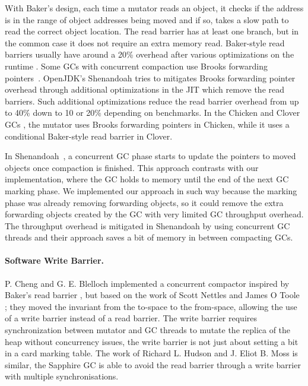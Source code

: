 \documentclass[sigplan,10pt,review,anonymous]{acmart}\settopmatter{printfolios=true,printccs=false,printacmref=false}
\newcommand{\todo}[1]{\color{orange}\fbox{\bfseries\sffamily\scriptsize TODO:}{\sf\small$\blacktriangleright$\textit{#1}$\blacktriangleleft$}\color{black}}
\begin{document}
With Baker's design, each time a mutator reads an object, it checks if the address is in the range of object addresses being moved and if so, takes a slow path to read the correct object location. The read barrier has at least one branch, but in the common case it does not require an extra memory read. Baker-style read barriers usually have around a 20\% overhead after various optimizations on the runtime \cite{BarrierMethods}.
Some GCs with concurrent compaction use Brooks forwarding pointers~\cite{MetronomeIBMGC,RTGCBrooksReadBarrier,Shenandoah}.
OpenJDK's Shenandoah \cite{Shenandoah} tries to mitigates Brooks forwarding pointer overhead through additional optimizations in the JIT which remove the read barriers. Such additional optimizations reduce the read barrier overhead from up to 40\% down to 10 or 20\% depending on benchmarks. In the Chicken and Clover GCs \cite{RTConcCompactGC}, the mutator uses Brooks forwarding pointers in Chicken, while it uses a conditional Baker-style read barrier in Clover.

In Shenandoah~\cite{Shenandoah}, a concurrent GC phase starts to update the pointers to moved objects once compaction is finished. This approach contrasts with our implementation, where the GC holds to memory until the end of the next GC marking phase. We implemented our approach in such way because the marking phase was already removing forwarding objects, so it could remove the extra forwarding objects created by the GC with very limited GC throughput overhead. The throughput overhead is mitigated in Shenandoah by using concurrent GC threads and their approach saves a bit of memory in between compacting GCs.

\paragraph{Software Write Barrier.}
P. Cheng and G. E. Blelloch \cite{WBConcCompactNew} implemented a concurrent compactor inspired by Baker's read barrier \cite{BakerReadBarrier}, but based on the work of Scott Nettles and James O Toole \cite{WBConcCompactOld}; they moved the invariant from the to-space to the from-space, allowing the use of a write barrier instead of a read barrier. 
The write barrier requires synchronization between mutator and GC threads to mutate the replica of the heap without concurrency issues, the write barrier is not just about setting a bit in a card marking table. The work of Richard L. Hudson and J. Eliot B. Moss \cite{SapphireConcCompactNoRB} is similar, the Sapphire GC is able to avoid the read barrier through a write barrier with multiple synchronisations.
\end{document}
